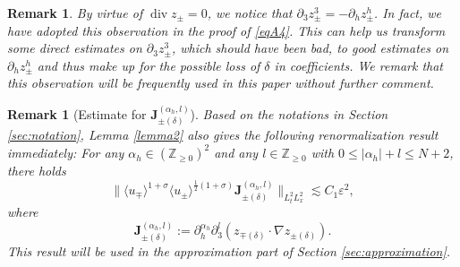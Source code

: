 \documentclass[10pt,reqno]{amsart}
\numberwithin{equation}{section}
\newtheorem{remark}[theorem]{Remark}
\begin{document}
\begin{remark}
	By virtue of $\operatorname{div} z_\pm=0$, we notice that  $\partial_3z_\pm^3=-\partial_hz_\pm^h$. In fact, we have adopted this observation in the proof of \eqref{eqA4}. This can help us transform 
	some direct estimates on $\partial_3z_\pm^3$, which should have been bad, to good estimates on $\partial_hz_\pm^h$ and thus make up for 
	 the possible loss of $\delta$ in coefficients. 
	We remark that  this
	observation will be frequently used in this paper without further comment.
\end{remark}

\begin{remark}[Estimate for $\mathbf{J}_{\pm(\delta)}^{(\alpha_h,l)}$]\label{remarkJ}
Based on the notations in Section \ref{sec:notation},   Lemma \ref{lemma2} also gives the following renormalization result immediately: 
	For any $\alpha_h\in(\mathbb{Z}_{\geqslant 0})^2$ and any $l\in\mathbb{Z}_{\geqslant 0}$ with $0\leqslant|\alpha_h|+l\leqslant N+2$, 
	there holds
	\[\big\|\langle u_\mp\rangle^{1+\sigma}\langle u_\pm\rangle^{\frac{1}{2}(1+\sigma)}\mathbf{J}_{\pm(\delta)}^{(\alpha_h,l)}\big\|_{L^2_tL^2_x}
	\lesssim C_1\varepsilon^2,\]
	where 
	\[\mathbf{J}_{\pm(\delta)}^{(\alpha_h,l)}:=\partial_h^{\alpha_h}\partial_3^{l}(z_{\mp(\delta)}\cdot \nabla z_{\pm(\delta)}).\]
	This result will be used in the approximation part of Section \ref{sec:approximation}.
\end{remark}
  
\end{document}
